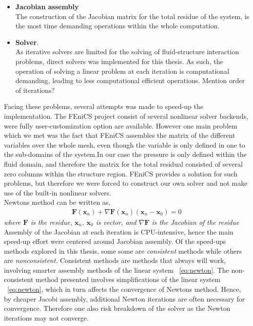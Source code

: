 \begin{itemize}
\item \textbf{Jacobian assembly} \\
The construction of the Jacobian matrix for the total residue of the system, is the most time demanding operations within the whole computation. 
\item \textbf{Solver}. \\ 
As iterative solvers are limited for the solving of fluid-structure interaction problems, direct solvers was implemented for this thesis. As such, the operation of solving a linear problem at each iteration is computational demanding, leading to  less computational efficient operations. Mention order of iterations?
\end{itemize}

Facing these problems, several attempts was made to speed-up the implementation. The FEniCS project consist of several nonlinear solver backends, were fully user-customization option are available. However one main problem which we met was the fact that FEniCS assembles the matrix of the different variables over the whole mesh, even though the variable is only defined in one to the sub-domains of the system.In our case the pressure is only defined within the fluid domain, and therefore the matrix for the total residual consisted of several zero columns within the structure region. FEniCS provides a solution for such problems, but therefore we were forced to construct our own solver and not make use of the built-in nonlinear solvers. \\

Newtons method can be written as,
\begin{align*}
\mathbf{F}(\mathbf{x}_n) + \nabla \mathbf{F}(\mathbf{x}_n)(\mathbf{x}_n - \mathbf{x}_0) = 0
\label{eq:newton}
\end{align*}
\textit{where $\mathbf{F}$ is the residue, $\mathbf{x}_n$, $\mathbf{x}_0$ is vector, and $ \nabla \mathbf{F}$ is the Jacobian of the residue} \\

Assembly of the Jacobian at each iteration is CPU-intensive, hence the main speed-up effort were centered around  Jacobian assembly. Of the speed-ups methods explored in this thesis, some some are \textit{consistent} methods while others are \textit{nonconsistent}. Consistent methods are methods that always will work, involving smarter assembly methods of the linear system ~\ref{eq:newton}. The non-consistent method presented involves simplifications of the linear system ~\ref{eq:newton}, which in turn affects the convergence of Newtons method. Hence, by cheaper Jacobi assembly,  additional Newton iterations are often necessary for convergence. Therefore one also risk breakdown of the solver as the Newton iterations may not converge.   


